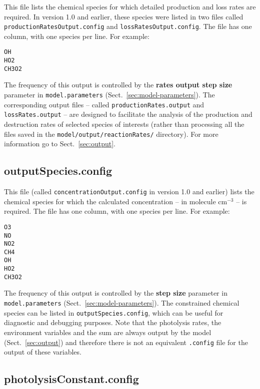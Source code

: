 This file lists the chemical species for which detailed production and
loss rates are required. In version 1.0 and earlier, these species
were listed in two files called \texttt{productionRatesOutput.config}
and \texttt{lossRatesOutput.config}. The file has one column, with one
species per line. For example:

\begin{verbatim}
OH
HO2
CH3O2
\end{verbatim}

The frequency of this output is controlled by the
\textbf{rates output step size} parameter in \texttt{model.parameters}
(Sect.~\ref{sec:model-parameters}). The corresponding output files --
called \texttt{productionRates.output} and \texttt{lossRates.output}
-- are designed to facilitate the analysis of the production and
destruction rates of selected species of interests (rather than
processing all the files saved in the \texttt{model/output/reactionRates/}
directory). For more information go to Sect.~\ref{sec:output}.

\subsection{outputSpecies.config} \label{subsec:outputspecies}

This file (called \texttt{concentrationOutput.config} in version 1.0
and earlier) lists the chemical species for which the calculated
concentration -- in molecule cm$^{-3}$ -- is required. The file has
one column, with one species per line. For example:

\begin{verbatim}
O3
NO
NO2
CH4
OH
HO2
CH3O2
\end{verbatim}

The frequency of this output is controlled by the \textbf{step size}
parameter in \texttt{model.parameters} (Sect.~\ref{sec:model-parameters}).
The constrained chemical species can be listed in
\texttt{outputSpecies.config}, which can be useful for diagnostic and
debugging purposes. Note that the photolysis rates, the environment
variables and the  sum are always output by the model
(Sect.~\ref{sec:output}) and therefore there is not an equivalent
\texttt{.config} file for the output of these variables.

\subsection{photolysisConstant.config} \label{subsec:photolysisconstant}


